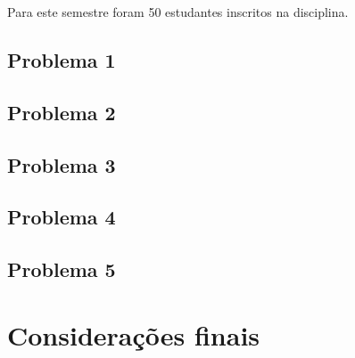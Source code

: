 Para este semestre foram 50 estudantes inscritos na disciplina.

\subsection{Problema 1}
\subsection{Problema 2}
\subsection{Problema 3}
\subsection{Problema 4}
\subsection{Problema 5}
\section{Considerações finais}

